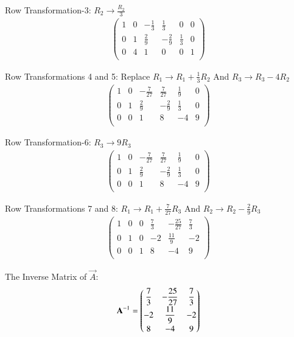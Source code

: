 \documentclass[journal]{IEEEtran}
\begin{document}
Row Transformation-3: $R_2 \rightarrow \frac{R_2}{3}$
\begin{align}
\left(
\begin{array}{ccc|ccc}
1 & 0 & -\frac{1}{3} & \frac{1}{3} & 0 & 0 \\
0 & 1 & \frac{2}{9} & -\frac{2}{9} & \frac{1}{3} & 0 \\
0 & 4 & 1 & 0 & 0 & 1 \\
\end{array}
\right)
\end{align}

Row Transformations 4 and 5: Replace $R_1 \rightarrow R_1 + \frac{1}{3}R_2$ And $R_3 \rightarrow R_3 - 4R_2$
\begin{align}
\left(
\begin{array}{ccc|ccc}
1 & 0 & -\frac{7}{27} & \frac{7}{27} & \frac{1}{9} & 0 \\
0 & 1 & \frac{2}{9} & -\frac{2}{9} & \frac{1}{3} & 0 \\
0 & 0 & 1 & 8 & -4 & 9 \\
\end{array}
\right)
\end{align}

Row Transformation-6: $R_3 \rightarrow 9R_3$
\begin{align}
\left(
\begin{array}{ccc|ccc}
1 & 0 & -\frac{7}{27} & \frac{7}{27} & \frac{1}{9} & 0 \\
0 & 1 & \frac{2}{9} & -\frac{2}{9} & \frac{1}{3} & 0 \\
0 & 0 & 1 & 8 & -4 & 9 \\
\end{array}
\right)
\end{align}

Row Transformations 7 and 8: $R_1 \rightarrow R_1 + \frac{7}{27}R_3 $ And $R_2 \rightarrow R_2 - \frac{2}{9}R_3 $
\begin{align}
\left(
\begin{array}{ccc|ccc}
1 & 0 & 0 & \frac{7}{3} & -\frac{25}{27} & \frac{7}{3} \\
0 & 1 & 0 & -2 & \frac{11}{9} & -2 \\
0 & 0 & 1 & 8 & -4 & 9 \\
\end{array}
\right)
\end{align}

The Inverse Matrix of $\vec{A}$:
\begin{align}
\mathbf{A}^{-1} = \begin{pmatrix} \dfrac{7}{3} & -\dfrac{25}{27} & \dfrac{7}{3} \\[1ex]
-2 & \dfrac{11}{9} & -2 \\[1ex]
8 & -4 & 9 \end{pmatrix}
\end{align}
\end{document}
